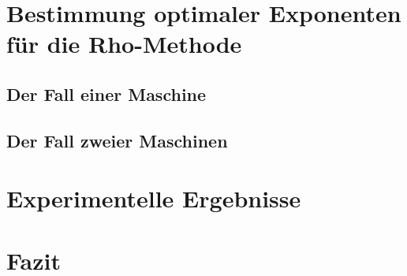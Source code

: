 \documentclass[a4paper, 10pt, ngerman]{article}
\begin{document}
\section{Bestimmung optimaler Exponenten für die Rho-Methode}

\subsection{Der Fall einer Maschine}

\subsection{Der Fall zweier Maschinen}

\section{Experimentelle Ergebnisse}\label{sec:ex}

\section{Fazit}

\printbibliography
\end{document}
